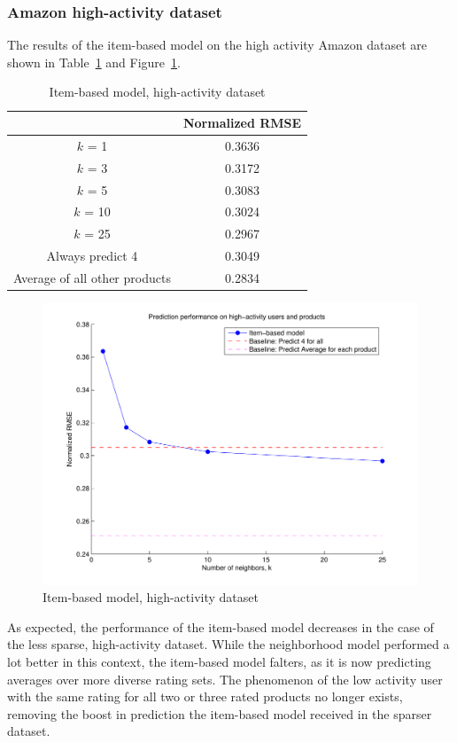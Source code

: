 \documentclass[letterpaper, 11 pt, conference]{ieeeconf}
\begin{document}
\subsubsection{Amazon high-activity dataset}
The results of the item-based model on the high activity Amazon dataset 
are shown in Table~\ref{table:modeltwo_subset} and 
Figure~\ref{fig:modeltwo_subset}.

\begin{table}[htb]
\centering
\begin{tabular}{|c|c|}
\cline{2-2}

\multicolumn{1}{c|}{}  & {Normalized RMSE} \tabularnewline \hline
$k$ = 1 & 0.3636 \tabularnewline
$k$ = 3 & 0.3172 \tabularnewline
$k$ = 5 & 0.3083 \tabularnewline
$k$ = 10 & 0.3024 \tabularnewline
$k$ = 25 & 0.2967 \tabularnewline
\hline
Always predict 4 & 0.3049 \tabularnewline 
Average of all other products & 0.2834 \tabularnewline
\hline
\end{tabular}
\caption{Item-based model, high-activity dataset}
\label{table:modeltwo_subset}
\end{table}

\begin{figure}[h]
\includegraphics[scale=0.5]{images/modeltwo_subset.pdf}
\caption{Item-based model, high-activity dataset}
\label{fig:modeltwo_subset}
\end{figure}


As expected, the performance of the item-based model decreases in the case
of the less sparse, high-activity dataset. While the neighborhood model
performed a lot better in this context, the item-based model falters, as
it is now predicting averages over more diverse rating sets. The
phenomenon of the low activity user with the same rating for all two or
three rated products no longer exists, removing the boost in prediction
the item-based model received in the sparser dataset.
\end{document}
